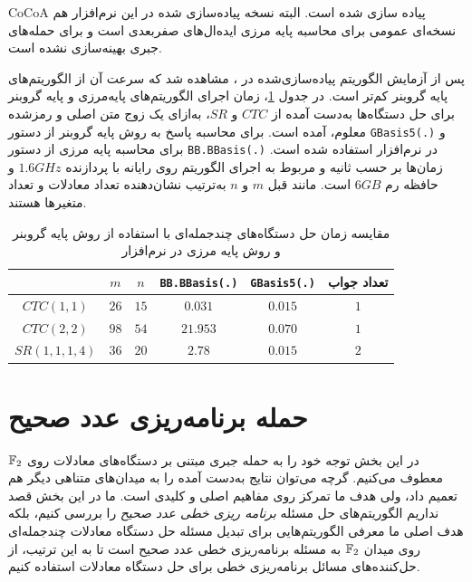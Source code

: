 \gls*{CoCoA}
\cite{CoCoA-5}
پیاده سازی شده است.  البته نسخه‌  پیاده‌سازی شده در این نرم‌افزار هم نسخه‌ای عمومی برای محاسبه‌   پایه‌  مرزی  ایده‌ال‌های صفربعدی است و برای حمله‌های جبری بهینه‌سازی نشده است. 

پس از آزمایش الگوریتم پیاده‌سازی‌شده در 
، 
مشاهده شد که سرعت آن از الگوریتم‌های پایه گروبنر کم‌تر است.  در جدول 
\ref{tab:comparison_between_GB_and_BB}، 
 زمان اجرای الگوریتم‌های پایه‌مرزی و پایه گروبنر  برای حل دستگاه‌ها به‌دست آمده از 
 $CTC$
و  
$SR$، 
به‌ازای یک زوج متن اصلی و رمزشده معلوم،  آمده است. برای  محاسبه پاسخ به روش پایه گروبنر از دستور 
\texttt{GBasis5(.)}
و برای محاسبه  پایه مرزی از دستور 
\texttt{BB.BBasis(.)}
در نرم‌افزار 
استفاده شده است. زمان‌ها بر حسب ثانیه و مربوط به اجرای الگوریتم روی رایانه با پردازنده 
$1.6GHz$
و حافظه رم
$6GB$
 است. مانند قبل 
 $m$
 و 
 $n$
 به‌ترتیب نشان‌دهنده تعداد معادلات و تعداد متغیرها هستند. 
 \begin{table}
\begin{center}
\begin{tabular}{||c||c|c|c|c|c||}
	\hline 
	 & $m$ & $n$ & \texttt{BB.BBasis(.)} & \texttt{GBasis5(.)} & {\footnotesize تعداد جواب} \\ 
	\hline 
	\hline
	$CTC(1, 1)$ & $26$ & $15$ & $0.031$ & $0.015$ & $1$ \\ 
	\hline 
	$CTC(2, 2)$ & $98$ & $54$ & $21.953$ & $0.070$ & $1$ \\ 
	\hline 
	$SR(1, 1, 1, 4)$ & $36$ & $20$ & $2.78$ & $0.015$ & $2$ \\ 
	\hline 
\end{tabular} 
\end{center} 
 	\caption{مقایسه  زمان حل دستگاه‌‌های  چندجمله‌ای 
 		 با استفاده از روش پایه گروبنر و روش پایه مرزی در نرم‌افزار 
 		}
 	\label{tab:comparison_between_GB_and_BB}
 \end{table}
 


\section{حمله‌ برنامه‌ریزی عدد صحیح}
در این بخش توجه خود را به حمله‌  جبری مبتنی بر دستگاه‌های معادلات روی 
$\mathbb{F}_{2}$
معطوف می‌کنیم. گرچه می‌توان نتایج به‌دست  آمده را به میدان‌های متناهی دیگر هم تعمیم داد، ولی هدف ما تمرکز روی مفاهیم اصلی و کلیدی است. ما در این بخش قصد نداریم الگوریتم‌های حل مسئله‌  
\textit{برنامه ریزی خطی عدد صحیح}
را بررسی کنیم، بلکه هدف اصلی ما معرفی الگوریتم‌هایی برای تبدیل مسئله‌  حل دستگاه معادلات چندجمله‌ای روی میدان 
$\mathbb{F}_{2}$
به مسئله‌  برنامه‌‌ریزی خطی عدد صحیح است تا به این ترتیب، از حل‌کننده‌های مسائل برنامه‌ریزی خطی برای حل دستگاه معادلات استفاده کنیم.  

